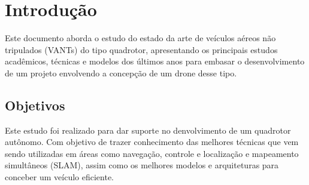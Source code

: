 \chapter{Introdução}
\label{chap:intro}

Este documento aborda o estudo do estado da arte de veículos aéreos não tripulados (VANTs) do tipo quadrotor, apresentando os principais estudos acadêmicos, técnicas e modelos dos últimos anos para embasar o desenvolvimento de um projeto envolvendo a concepção de um drone desse tipo. 






\section{Objetivos}
\label{sec:obj}


Este estudo foi realizado para dar suporte no denvolvimento de um quadrotor autônomo. Com objetivo de trazer conhecimento das melhores técnicas que vem sendo utilizadas em áreas como navegação, controle e localização e mapeamento simultâneos (SLAM), assim como os melhores modelos e arquiteturas para conceber um veículo eficiente.
\label{sec:obj}



